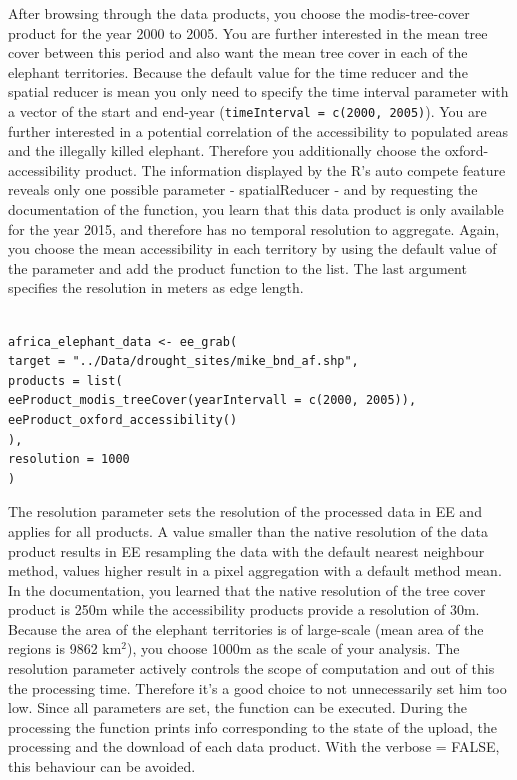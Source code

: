 After browsing through the data products, you choose the modis-tree-cover product for the year 2000 to 2005. You are further interested in the mean tree cover between this period and also want the mean tree cover in each of the elephant territories. Because the default value for the time reducer and the spatial reducer is mean you only need to specify the time interval parameter with a vector of the start and end-year (\texttt{timeInterval = c(2000, 2005)}). You are further interested in a potential correlation of the accessibility to populated areas and the illegally killed elephant. Therefore you additionally choose the oxford-accessibility product. The information displayed by the R's auto compete feature reveals only one possible parameter - spatialReducer - and by requesting the documentation of the function, you learn that this data product is only available for the year 2015, and therefore has no temporal resolution to aggregate. Again, you choose the mean accessibility in each territory by using the default value of the parameter and add the product function to the list. The last argument specifies the resolution in meters as edge length. 


\begin{lstlisting}

africa_elephant_data <- ee_grab(
target = "../Data/drought_sites/mike_bnd_af.shp",
products = list(
eeProduct_modis_treeCover(yearIntervall = c(2000, 2005)),
eeProduct_oxford_accessibility()
),
resolution = 1000
)
\end{lstlisting}


The resolution parameter sets the resolution of the processed data in EE and applies for all products. A value smaller than the native resolution of the data product results in EE resampling the data with the default nearest neighbour method, values higher result in a pixel aggregation with a default method mean. In the documentation, you learned that the native resolution of the tree cover product is 250m while the accessibility products provide a resolution of 30m. Because the area of the elephant territories is of large-scale (mean area of the regions is 9862 km$^2$), you choose 1000m as the scale of your analysis. The resolution parameter actively controls the scope of computation and out of this the processing time. Therefore it's a good choice to not unnecessarily set him too low. 
Since all parameters are set, the function can be executed. 
During the processing the function prints info corresponding to the state of the upload, the processing and the download of each data product. With the verbose = FALSE, this behaviour can be avoided. 


